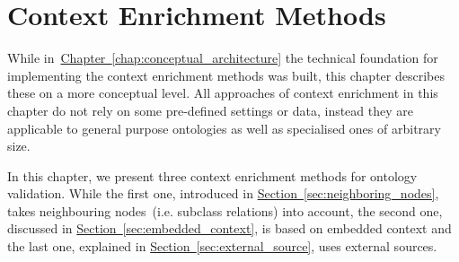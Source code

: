 \chapter{Context Enrichment Methods}\label{chap:context_enrichment_methods}
While in~\hyperref[chap:conceptual_architecture]{Chapter~\ref*{chap:conceptual_architecture}} the technical foundation for implementing the context enrichment methods was built, this chapter describes these on a more conceptual level. All approaches of context enrichment in this chapter do not rely on some pre-defined settings or data, instead they are applicable to general purpose ontologies as well as specialised ones of arbitrary size.

In this chapter, we present three context enrichment methods for ontology validation. While the first one, introduced in \hyperref[sec:neighboring_nodes]{Section~\ref*{sec:neighboring_nodes}}, takes neighbouring nodes~(i.e. subclass relations) into account, the second one, discussed in \hyperref[sec:embedded_context]{Section~\ref*{sec:embedded_context}}, is based on embedded context and the last one, explained in \hyperref[sec:external_source]{Section~\ref*{sec:external_source}}, uses external sources. 












